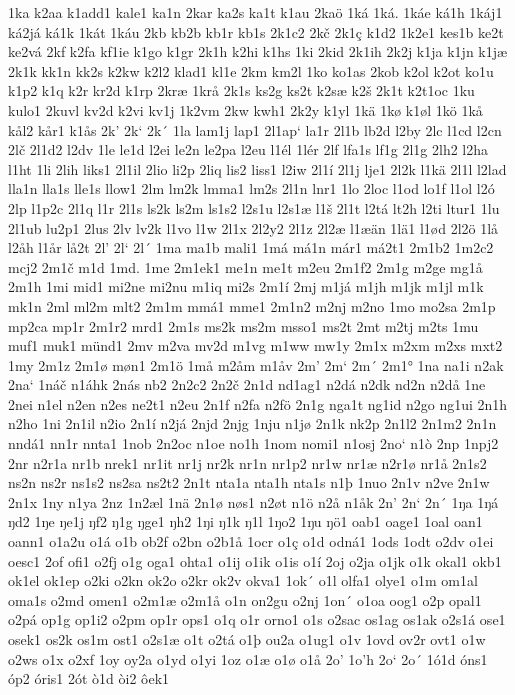 1ka
k2aa
k1add1
kale1
ka1n
2kar
ka2s
ka1t
k1au
2kaö
1ká
1ká.
1káe
ká1h
1káj1
ká2já
ká1k
1kát
1káu
2kb
kb2b
kb1r
kb1s
2k1c2
2kč
2k1ç
k1d2
1k2e1
kes1b
ke2t
ke2vá
2kf
k2fa
kf1ie
k1go
k1gr
2k1h
k2hi
k1hs
1ki
2kid
2k1ih
2k2j
k1ja
k1jn
k1jæ
2k1k
kk1n
kk2s
k2kw
k2l2
klad1
kl1e
2km
km2l
1ko
ko1as
2kob
k2ol
k2ot
ko1u
k1p2
k1q
k2r
kr2d
k1rp
2kræ
1krå
2k1s
ks2g
ks2t
k2sæ
k2š
2k1t
k2t1oc
1ku
kulo1
2kuvl
kv2d
k2vi
kv1j
1k2vm
2kw
kwh1
2k2y
k1yl
1kä
1kø
k1øl
1kö
1kå
kål2
kår1
k1ås
2k'
2k`
2k´
1la
lam1j
lap1
2l1ap`
la1r
2l1b
lb2d
l2by
2lc
l1cd
l2cn
2lč
2l1d2
l2dv
1le
le1d
l2ei
le2n
le2pa
l2eu
l1él
1lér
2lf
lfa1s
lf1g
2l1g
2lh2
l2ha
l1ht
1li
2lih
liks1
2l1il
2lio
li2p
2liq
lis2
liss1
l2iw
2l1í
2l1j
lje1
2l2k
l1kä
2l1l
l2lad
lla1n
lla1s
lle1s
llow1
2lm
lm2k
lmma1
lm2s
2l1n
lnr1
1lo
2loc
l1od
lo1f
l1ol
l2ó
2lp
l1p2c
2l1q
l1r
2l1s
ls2k
ls2m
ls1s2
l2s1u
l2s1æ
l1š
2l1t
l2tá
lt2h
l2ti
ltur1
1lu
2l1ub
lu2p1
2lus
2lv
lv2k
l1vo
l1w
2l1x
2l2y2
2l1z
2l2æ
l1æän
1lä1
l1ød
2l2ö
1lå
l2åh
l1år
lå2t
2l'
2l`
2l´
1ma
ma1b
mali1
1má
má1n
már1
má2t1
2m1b2
1m2c2
mcj2
2m1č
m1d
1md.
1me
2m1ek1
me1n
me1t
m2eu
2m1f2
2m1g
m2ge
mg1å
2m1h
1mi
mid1
mi2ne
mi2nu
m1iq
mi2s
2m1í
2mj
m1já
m1jh
m1jk
m1jl
m1k
mk1n
2ml
ml2m
mlt2
2m1m
mmá1
mme1
2m1n2
m2nj
m2no
1mo
mo2sa
2m1p
mp2ca
mp1r
2m1r2
mrd1
2m1s
ms2k
ms2m
msso1
ms2t
2mt
m2tj
m2ts
1mu
muf1
muk1
münd1
2mv
m2va
mv2d
m1vg
m1ww
mw1y
2m1x
m2xm
m2xs
mxt2
1my
2m1z
2m1ø
møn1
2m1ö
1må
m2åm
m1åv
2m'
2m`
2m´
2m1°
1na
na1i
n2ak
2na`
1náč
n1áhk
2nás
nb2
2n2c2
2n2č
2n1d
nd1ag1
n2dá
n2dk
nd2n
n2då
1ne
2nei
n1el
n2en
n2es
ne2t1
n2eu
2n1f
n2fa
n2fö
2n1g
nga1t
ng1id
n2go
ng1ui
2n1h
n2ho
1ni
2n1il
n2io
2n1í
n2já
2njd
2njg
1nju
n1jø
2n1k
nk2p
2n1l2
2n1m2
2n1n
nndá1
nn1r
nnta1
1nob
2n2oc
n1oe
no1h
1nom
nomi1
n1osj
2no`
n1ò
2np
1npj2
2nr
n2r1a
nr1b
nrek1
nr1it
nr1j
nr2k
nr1n
nr1p2
nr1w
nr1æ
n2r1ø
nr1å
2n1s2
ns2n
ns2r
ns1s2
ns2sa
ns2t2
2n1t
nta1a
nta1h
nta1s
n1þ
1nuo
2n1v
n2ve
2n1w
2n1x
1ny
n1ya
2nz
1n2æl
1nä
2n1ø
nøs1
n2øt
n1ö
n2å
n1åk
2n'
2n`
2n´
1ŋa
1ŋá
ŋd2
1ŋe
ŋe1j
ŋf2
ŋ1g
ŋge1
ŋh2
1ŋi
ŋ1k
ŋ1l
1ŋo2
1ŋu
ŋö1
oab1
oage1
1oal
oan1
oann1
o1a2u
o1á
o1b
ob2f
o2bn
o2b1å
1ocr
o1ç
o1d
odná1
1ods
1odt
o2dv
o1ei
oesc1
2of
ofi1
o2fj
o1g
oga1
ohta1
o1ij
o1ik
o1is
o1í
2oj
o2ja
o1jk
o1k
okal1
okb1
ok1el
ok1ep
o2ki
o2kn
ok2o
o2kr
ok2v
okva1
1ok´
o1l
olfa1
olye1
o1m
om1al
oma1s
o2md
omen1
o2m1æ
o2m1å
o1n
on2gu
o2nj
1on´
o1oa
oog1
o2p
opal1
o2pá
op1g
op1i2
o2pm
op1r
ops1
o1q
o1r
orno1
o1s
o2sac
os1ag
os1ak
o2s1á
ose1
osek1
os2k
os1m
ost1
o2s1æ
o1t
o2tá
o1þ
ou2a
o1ug1
o1v
1ovd
ov2r
ovt1
o1w
o2ws
o1x
o2xf
1oy
oy2a
o1yd
o1yi
1oz
o1æ
o1ø
o1å
2o'
1o'h
2o`
2o´
1ó1d
óns1
óp2
óris1
2ót
ò1d
òi2
ôek1
